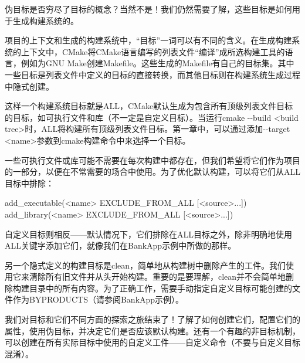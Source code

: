 伪目标是否穷尽了目标的概念？当然不是！我们仍然需要了解，这些目标是如何用于生成构建系统的。


项目的上下文和生成的构建系统中，“目标”一词可以有不同的含义。在生成构建系统的上下文中，CMake将CMake语言编写的列表文件“编译”成所选构建工具的语言，例如为GNU Make创建Makefile。这些生成的Makefile有自己的目标集。其中一些目标是列表文件中定义的目标的直接转换，而其他目标则在构建系统生成过程中隐式创建。

这样一个构建系统目标就是ALL，CMake默认生成为包含所有顶级列表文件目标的目标，如可执行文件和库（不一定是自定义目标）。当运行cmake -{}-build <build tree>时，ALL将构建所有顶级列表文件目标。第一章中，可以通过添加-{}-target <name>参数到cmake构建命令中来选择一个目标。

一些可执行文件或库可能不需要在每次构建中都存在，但我们希望将它们作为项目的一部分，以便在不常需要的场合中使用。为了优化默认构建，可以将它们从ALL目标中排除：

\begin{shell}
add_executable(<name> EXCLUDE_FROM_ALL [<source>...])
add_library(<name> EXCLUDE_FROM_ALL [<source>...])
\end{shell}

自定义目标则相反——默认情况下，它们排除在ALL目标之外，除非明确地使用ALL关键字添加它们，就像我们在BankApp示例中所做的那样。

另一个隐式定义的构建目标是clean，简单地从构建树中删除产生的工件。我们使用它来清除所有旧文件并从头开始构建。重要的是要理解，clean并不会简单地删除构建目录中的所有内容。为了正确工作，需要手动指定自定义目标可能创建的文件作为BYPRODUCTS（请参阅BankApp示例）。

我们对目标和它们不同方面的探索之旅结束了！了解了如何创建它们，配置它们的属性，使用伪目标，并决定它们是否应该默认构建。还有一个有趣的非目标机制，可以创建在所有实际目标中使用的自定义工件——自定义命令（不要与自定义目标混淆）。


